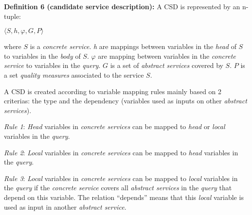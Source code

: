 \noindent \textbf{Definition 6 (candidate service description):} A CSD is represented by an n-tuple:
\begin{center}
$\langle S, h, \varphi, G, P\rangle$
\end{center}
where $S$ is a \textit{concrete service}. 
\textit{h} are mappings between variables in the \textit{head} of $S$ to variables in the \textit{body} of $S$. 
$\varphi$ are mapping between variables in the \textit{concrete service} to variables in the \textit{query}.
$G$ is a set of \textit{abstract services} covered by $S$. 
$P$ is a set \textit{quality measures} associated to the service $S$. 

A CSD is created according to variable mapping rules mainly based on 2 criterias: the type and the dependency (variables used as inputs on other \textit{abstract services}). 
\begin{description}
\item \textit{Rule 1}: \textit{Head} variables in \textit{concrete services} can be mapped to \textit{head} or \textit{local} variables in the \textit{query}.
\item \textit{Rule 2}: \textit{Local} variables in \textit{concrete services} can be mapped to \textit{head} variables in the \textit{query}.
\item \textit{Rule 3}: \textit{Local} variables in \textit{concrete services} can be mapped to \textit{local}
 variables in the \textit{query} if the \textit{concrete service} covers all \textit{abstract services} in the \textit{query} that depend on this variable. The relation ``depends''  means that this \textit{local} variable is used as input in another \textit{abstract service}. 
\end{description}